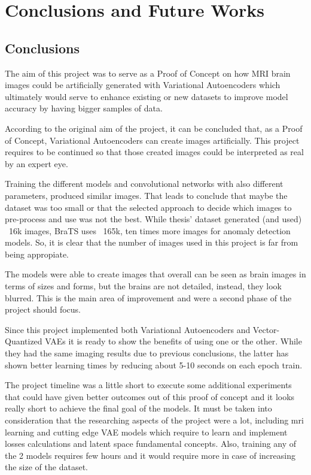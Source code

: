 \chapter{Conclusions and Future Works}

\section{Conclusions}

The aim of this project was to serve as a Proof of Concept on how MRI brain images could be artificially generated with Variational Autoencoders which ultimately would serve to enhance existing or new datasets to improve model accuracy by having bigger samples of data.

According to the original aim of the project, it can be concluded that, as a Proof of Concept, Variational Autoencoders can create images artificially. This project requires to be continued so that those created images could be interpreted as real by an expert eye.

Training the different models and convolutional networks with also different parameters, produced similar images. That leads to conclude that maybe the  dataset was too small or that the selected approach to decide which images to pre-process and use was not the best. While thesis' dataset generated (and used) ~16k images, BraTS \cite{brats} uses ~165k, ten times more images for anomaly detection models. So, it is clear that the number of images used in this project is far from being appropiate.

The models were able to create images that overall can be seen as brain images in terms of sizes and forms, but the brains are not detailed, instead, they look blurred. This is the main area of improvement and were a second phase of the project should focus.

Since this project implemented both Variational Autoencoders and Vector-Quantized VAEs it is ready to show the benefits of using one or the other. While they had the same imaging results due to previous conclusions, the latter has shown better learning times by reducing about 5-10 seconds on each epoch train.

The project timeline was a little short to execute some additional experiments that could have given better outcomes out of this proof of concept and it looks really short to achieve the final goal of the models. It must be taken into consideration that the researching aspects of the project were a lot, including \acrshort{mri} learning and cutting edge VAE models which require to learn and implement losses calculations and latent space fundamental concepts. Also, training any of the 2 models requires few hours and it would require more in case of increasing the size of the dataset.

